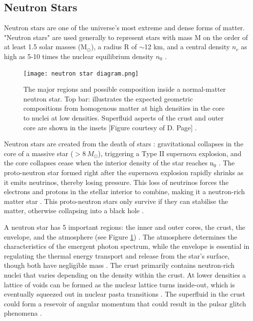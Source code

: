 \documentclass[12pt]{article}
\begin{document}
\subsection{Neutron Stars} \label{sec:1.2}

Neutron stars are one of the universe's most extreme and dense forms of matter. "Neutron stars" are used generally to represent stars with mass M on the order of at least 1.5 solar masses (M$_{\odot}$), a radius R of $\sim$12 km, and a central density $n_c$ as high as 5-10 times the nuclear equilibrium density $n_0$ \cite{neutronstars}.

\begin{figure}[!b]
    \centering
    \texttt{[image: neutron star diagram.png]}
    \caption{The major regions and possible composition inside a normal-matter neutron star. Top bar: illustrates the expected geometric compositions from homogenous matter at high densities in the core to nuclei at low densities.
    Superfluid aspects of the crust and outer core are shown in the insets [Figure courtesy of D. Page] \protect\cite{neutronstars}.}
    \label{fig:1}
\end{figure}

Neutron stars are created from the death of stars \cite{neutronstars2}: gravitational collapses in the core of a massive star ($>8 \: M_{\odot}$), triggering a Type II supernova explosion, and the core collapses cease when the interior density of the star reaches n$_0$ \cite{neutronstars}.
The proto-neutron star formed right after the supernova explosion rapidly shrinks as it emits neutrinos, thereby losing pressure. This loss of neutrinos forces the electrons and protons in the stellar interior to combine, making it a neutron-rich matter star \cite{neutronstars,neutronstars2,neutronstars3}. This proto-neutron stars only survive if they can stabilise the matter,
otherwise collapsing into a black hole \cite{neutronstars}.

A neutron star has 5 important regions: the inner and outer cores, the crust, the envelope, and the atmosphere (see Figure \ref{fig:1}) \cite{neutronstars}.
The atmosphere determines the characteristics of the emergent photon spectrum, while the envelope is essential in regulating the thermal energy transport and release from the star's surface, though both have negligible mass \cite{neutronstars}.
The crust primarily contains neutron-rich nuclei that varies depending on the density within the crust. At lower densities a lattice of voids can be formed as the nuclear lattice turns inside-out, which is eventually squeezed out in nuclear pasta transitions \cite{neutronstars}.
The superfluid in the crust could form a resevoir of angular momentum that could result in the pulsar glitch phenomena \cite{neutronstars}.
\end{document}
